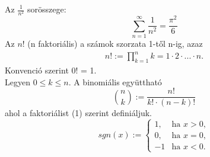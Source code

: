 \documentclass{article}
\begin{document}
Az $\frac{1}{n^2}$ sorösszege:
\[\sum_{n=1}^\infty \frac{1}{n^2}=\frac{\pi^2}{6}\]
Az $n!$ (n faktoriális) a számok szorzata 1-től n-ig, azaz
\begin{gather}
n!:=\prod_{k=1}^{n}k=1\cdot 2\cdot ...\cdot n.
\end{gather}
Konvenció szerint 0! = 1.\\
Legyen $0 \leq k \leq n$. A binomiális együttható
\[\binom{n}{k}:=\frac{n!}{k!\cdot (n-k)!}\]
ahol a faktoriálist (1) szerint definiáljuk.\\
\[sgn(x):=
\begin{cases}
1, & \text{ha } x>0, \\
0, & \text{ha } x=0, \\
-1 & \text{ha } x<0.
\end{cases}
\]
\end{document}
